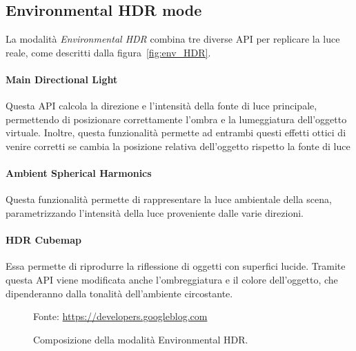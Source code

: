 \documentclass[crop=false, class=book]{standalone}
\begin{document}
	

	\subsection{Environmental HDR mode}
		La modalità \textit{Environmental HDR} combina tre diverse API per replicare la luce reale, come descritti dalla figura~\vref{fig:env_HDR}.
	
		\paragraph*{Main Directional Light}
			Questa API calcola la direzione e l'intensità della fonte di luce principale, permettendo di posizionare correttamente l'ombra e la lumeggiatura dell'oggetto virtuale. Inoltre, questa funzionalità permette ad entrambi questi effetti ottici di venire corretti se cambia la posizione relativa dell'oggetto rispetto la fonte di luce
		
		\paragraph*{Ambient Spherical Harmonics}
			Questa funzionalità permette di rappresentare la luce ambientale della scena, parametrizzando l'intensità della luce proveniente dalle varie direzioni.
		
	
		\paragraph*{HDR Cubemap}
			Essa permette di riprodurre la riflessione di oggetti con superfici lucide. Tramite questa API viene modificata anche l'ombreggiatura e il colore dell'oggetto, che dipenderanno dalla tonalità dell'ambiente circostante.
	
		\begin{figure}
			\centering
			{Fonte: \url{https://developers.googleblog.com}}
			\caption{Composizione della modalità Environmental HDR.}
			\label{fig:env_HDR}
		\end{figure}
	
\end{document}

